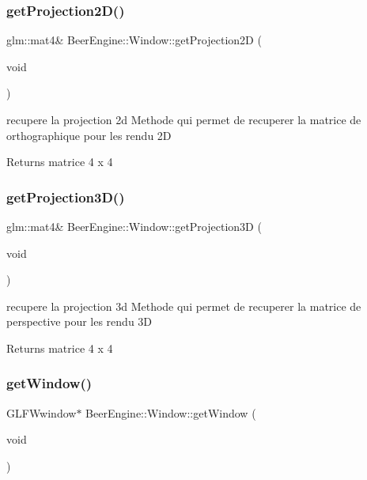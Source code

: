 \subsubsection{\texorpdfstring{get\+Projection2\+D()}{getProjection2D()}}
{\footnotesize\ttfamily glm\+::mat4\& Beer\+Engine\+::\+Window\+::get\+Projection2D (\begin{DoxyParamCaption}\item[{void}]{ }\end{DoxyParamCaption})}



recupere la projection 2d Methode qui permet de recuperer la matrice de orthographique pour les rendu 2D 

\begin{DoxyReturn}{Returns}
matrice 4 x 4 
\end{DoxyReturn}
\mbox{\label{class_beer_engine_1_1_window_a5f6872e397ddae51b61d0d140d3dca82}} 
\subsubsection{\texorpdfstring{get\+Projection3\+D()}{getProjection3D()}}
{\footnotesize\ttfamily glm\+::mat4\& Beer\+Engine\+::\+Window\+::get\+Projection3D (\begin{DoxyParamCaption}\item[{void}]{ }\end{DoxyParamCaption})}



recupere la projection 3d Methode qui permet de recuperer la matrice de perspective pour les rendu 3D 

\begin{DoxyReturn}{Returns}
matrice 4 x 4 
\end{DoxyReturn}
\mbox{\label{class_beer_engine_1_1_window_af7a6662e99bb0d07787014adacb8db33}} 
\subsubsection{\texorpdfstring{get\+Window()}{getWindow()}}
{\footnotesize\ttfamily G\+L\+F\+Wwindow$\ast$ Beer\+Engine\+::\+Window\+::get\+Window (\begin{DoxyParamCaption}\item[{void}]{ }\end{DoxyParamCaption})}



